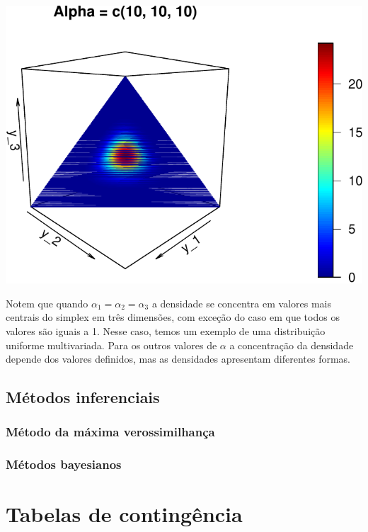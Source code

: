 \documentclass[]{book}
\begin{document}
\begin{center}\includegraphics[width=0.8\linewidth]{notas_livro_files/figure-latex/graf15-5} \end{center}

Notem que quando \(\alpha_1 = \alpha_2 = \alpha_3\) a densidade se concentra em valores mais centrais do simplex em três dimensões, com exceção do caso em que todos os valores são iguais a 1. Nesse caso, temos um exemplo de uma distribuição uniforme multivariada. Para os outros valores de \(\alpha\) a concentração da densidade depende dos valores definidos, mas as densidades apresentam diferentes formas.

\hypertarget{metodos-inferenciais}{%
\section{Métodos inferenciais}\label{metodos-inferenciais}}

\hypertarget{metodo-da-maxima-verossimilhanca}{%
\subsection{Método da máxima verossimilhança}\label{metodo-da-maxima-verossimilhanca}}

\hypertarget{metodos-bayesianos}{%
\subsection{Métodos bayesianos}\label{metodos-bayesianos}}

\hypertarget{tabelas-de-contingencia}{%
\chapter{Tabelas de contingência}\label{tabelas-de-contingencia}}
\end{document}
